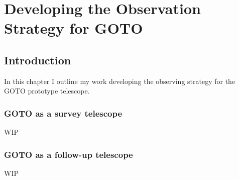 \chapter{Developing the Observation Strategy for GOTO}
\label{chap:strategy}
\chaptoc{}


\newpage
\section{Introduction}
\label{sec:strategy_intro}
\begin{colsection}


\begin{colsection}

In this chapter I outline my work developing the observing strategy for the GOTO prototype telescope.

\end{colsection}


\subsection{GOTO as a survey telescope}
\label{sec:survey_telescope}
\begin{colsection}

WIP

\end{colsection}


\subsection{GOTO as a follow-up telescope}
\label{sec:followup_telescope}
\begin{colsection}

WIP

\end{colsection}


\end{colsection}


\newpage
